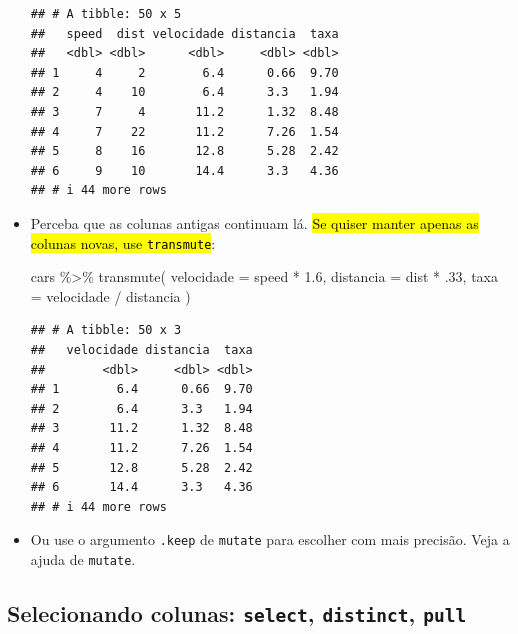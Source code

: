 \documentclass[
  11pt]{report}
\newenvironment{Shaded}{\begin{snugshade}}{\end{snugshade}}
\newcommand{\AttributeTok}[1]{\textcolor[rgb]{0.77,0.63,0.00}{#1}}
\newcommand{\DecValTok}[1]{\textcolor[rgb]{0.00,0.00,0.81}{#1}}
\newcommand{\FloatTok}[1]{\textcolor[rgb]{0.00,0.00,0.81}{#1}}
\newcommand{\FunctionTok}[1]{\textcolor[rgb]{0.00,0.00,0.00}{#1}}
\newcommand{\NormalTok}[1]{#1}
\newcommand{\SpecialCharTok}[1]{\textcolor[rgb]{0.00,0.00,0.00}{#1}}
\renewenvironment{Shaded}{
    \begin{mdframed}[%
      roundcorner=2pt,%
      innerleftmargin=5pt,%
      innerrightmargin=5pt,%
      topline=true,%
      leftline=true,%
      rightline=true,%
      bottomline=true,%
      linewidth=0.5pt,%
      linecolor=black!20,%
      backgroundcolor=black!2,%
      skipabove=2ex,%
      skipbelow=2.5ex%
    ]%
  }
  {
    \end{mdframed}
  }
\begin{document}
\begin{itemize}
\begin{verbatim}
## # A tibble: 50 x 5
##   speed  dist velocidade distancia  taxa
##   <dbl> <dbl>      <dbl>     <dbl> <dbl>
## 1     4     2        6.4      0.66  9.70
## 2     4    10        6.4      3.3   1.94
## 3     7     4       11.2      1.32  8.48
## 4     7    22       11.2      7.26  1.54
## 5     8    16       12.8      5.28  2.42
## 6     9    10       14.4      3.3   4.36
## # i 44 more rows
\end{verbatim}
\item
  Perceba que as colunas antigas continuam lá. {\hl{Se quiser manter apenas as colunas novas, use {\mbox{\texttt{transmute}}}}}:

\begin{Shaded}
\begin{Highlighting}[]
\NormalTok{cars }\SpecialCharTok{\%\textgreater{}\%} 
  \FunctionTok{transmute}\NormalTok{(}
    \AttributeTok{velocidade =}\NormalTok{ speed }\SpecialCharTok{*} \FloatTok{1.6}\NormalTok{,}
    \AttributeTok{distancia =}\NormalTok{ dist }\SpecialCharTok{*}\NormalTok{ .}\DecValTok{33}\NormalTok{,}
    \AttributeTok{taxa =}\NormalTok{ velocidade }\SpecialCharTok{/}\NormalTok{ distancia}
\NormalTok{  )}
\end{Highlighting}
\end{Shaded}

\begin{verbatim}
## # A tibble: 50 x 3
##   velocidade distancia  taxa
##        <dbl>     <dbl> <dbl>
## 1        6.4      0.66  9.70
## 2        6.4      3.3   1.94
## 3       11.2      1.32  8.48
## 4       11.2      7.26  1.54
## 5       12.8      5.28  2.42
## 6       14.4      3.3   4.36
## # i 44 more rows
\end{verbatim}
\item
  Ou use o argumento \texttt{.keep} de \texttt{mutate} para escolher com mais precisão. Veja a ajuda de \texttt{mutate}.
\end{itemize}

\hypertarget{selecionando-colunas-select-distinct-pull}{%
\subsection{\texorpdfstring{Selecionando colunas: \texttt{select}, \texttt{distinct}, \texttt{pull}}{Selecionando colunas: select, distinct, pull}}\label{selecionando-colunas-select-distinct-pull}}
\end{document}
